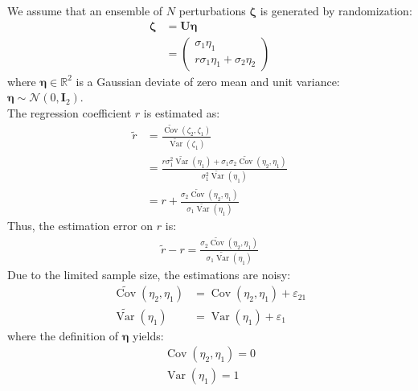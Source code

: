 \documentclass[12pt]{scrartcl}
\DeclareMathOperator{\Cov}{Cov}
\DeclareMathOperator{\Var}{Var}
\begin{document}
We assume that an ensemble of $N$ perturbations $\boldsymbol{\zeta}$ is generated by randomization:
\begin{align}
\boldsymbol{\zeta} & = \mathbf{U} \boldsymbol{\eta} \nonumber \\
 & = \left( \begin{array}{c}
\sigma_1 \eta_1 \\
r \sigma_1 \eta_1 + \sigma_2 \eta_2
\end{array} \right)
\end{align}
where $\boldsymbol{\eta} \in \mathbb{R}^2$ is a Gaussian deviate of zero mean and unit variance: $\boldsymbol{\eta} \sim \mathcal{N}\left(0, \mathbf{I}_2\right)$.\\
$  $\\
The regression coefficient $r$ is estimated as:
\begin{align}
\widetilde{r} & = \frac{\widetilde{\Cov}\left(\zeta_2, \zeta_1\right)}{\widetilde{\Var}\left(\zeta_1\right)} \nonumber \\
& = \frac{r \sigma_1^2 \widetilde{\Var}\left(\eta_1\right) + \sigma_1 \sigma_2 \widetilde{\Cov}\left(\eta_2, \eta_1\right)}{\sigma_1^2 \widetilde{\Var}\left(\eta_1\right)} \nonumber \\
& = r + \frac{\sigma_2 \widetilde{\Cov}\left(\eta_2, \eta_1\right)}{\sigma_1 \widetilde{\Var}\left(\eta_1\right)}
\end{align}
Thus, the estimation error on $r$ is:
\begin{align}
\widetilde{r} - r = \frac{\sigma_2 \widetilde{\Cov}\left(\eta_2, \eta_1\right)}{\sigma_1 \widetilde{\Var}\left(\eta_1\right)}
\end{align}
Due to the limited sample size, the estimations are noisy:
\begin{subequations}
\begin{align}
\widetilde{\Cov}\left(\eta_2, \eta_1\right) & = \Cov\left(\eta_2, \eta_1\right) + \varepsilon_{21} \\
\widetilde{\Var}\left(\eta_1\right) & = \Var\left(\eta_1\right) + \varepsilon_1
\end{align}
\end{subequations}
where the definition of $\boldsymbol{\eta}$ yields:
\begin{subequations}
\begin{align}
\Cov\left(\eta_2, \eta_1\right) = 0 \\
\Var\left(\eta_1\right) = 1
\end{align}
\end{subequations}
\end{document}
